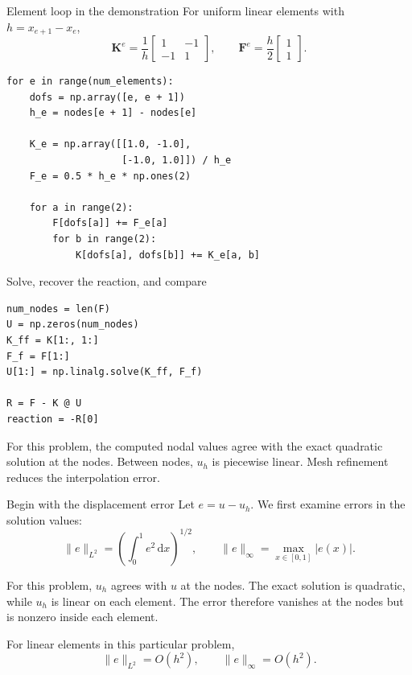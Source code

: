 \documentclass[11pt,aspectratio=169]{beamer}
\newcommand{\dd}{\,\mathrm{d}}
\newcommand{\bK}{\bm K}
\newcommand{\bF}{\bm F}
\begin{document}
\begin{frame}[fragile]{Element loop in the demonstration}
For uniform linear elements with $h=x_{e+1}-x_e$,
\[
  \bK^e=\frac{1}{h}
  \begin{bmatrix}1&-1\\-1&1\end{bmatrix},
  \qquad
  \bF^e=\frac{h}{2}
  \begin{bmatrix}1\\1\end{bmatrix}.
\]

\begin{lstlisting}
for e in range(num_elements):
    dofs = np.array([e, e + 1])
    h_e = nodes[e + 1] - nodes[e]

    K_e = np.array([[1.0, -1.0],
                    [-1.0, 1.0]]) / h_e
    F_e = 0.5 * h_e * np.ones(2)

    for a in range(2):
        F[dofs[a]] += F_e[a]
        for b in range(2):
            K[dofs[a], dofs[b]] += K_e[a, b]
\end{lstlisting}
\end{frame}

\begin{frame}[fragile]{Solve, recover the reaction, and compare}
\begin{lstlisting}
num_nodes = len(F)
U = np.zeros(num_nodes)
K_ff = K[1:, 1:]
F_f = F[1:]
U[1:] = np.linalg.solve(K_ff, F_f)

R = F - K @ U
reaction = -R[0]
\end{lstlisting}

For this problem, the computed nodal values agree with the exact quadratic
solution at the nodes. Between nodes, $u_h$ is piecewise linear. Mesh
refinement reduces the interpolation error.
\end{frame}

\begin{frame}{Begin with the displacement error}
Let $e=u-u_h$. We first examine errors in the solution values:
\[
  \lVert e\rVert_{L^2}
  =\left(\int_0^1e^2\dd x\right)^{1/2},
  \qquad
  \lVert e\rVert_{\infty}
  =\max_{x\in[0,1]}|e(x)|.
\]

For this problem, $u_h$ agrees with $u$ at the nodes. The exact solution is
quadratic, while $u_h$ is linear on each element. The error therefore vanishes
at the nodes but is nonzero inside each element.

For linear elements in this particular problem,
\[
  \lVert e\rVert_{L^2}=O(h^2),
  \qquad
  \lVert e\rVert_{\infty}=O(h^2).
\]
\end{frame}
\end{document}
